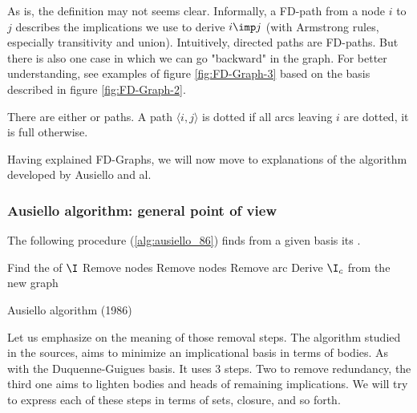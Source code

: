 \noindent As is, the definition may not seems clear. Informally, a FD-path 
from a node $i$ to $j$ describes the implications we use to derive $i \imp j$
(with Armstrong rules, especially transitivity and union). Intuitively, 
directed paths are FD-paths. But there is also one case in which
we can go "backward" in the graph. For better understanding, see examples of
figure \ref{fig:FD-Graph-3} based on the basis described in figure 
\ref{fig:FD-Graph-2}.

\begin{center}
	
\end{center}

There are either  or  paths. A path $\langle i, j
\rangle$ is dotted if all arcs leaving $i$ are dotted, it is full otherwise.

\begin{center}
	
\end{center}

\vspace{1.2em}

Having explained FD-Graphs, we will now move to explanations of the algorithm
developed by Ausiello and al.

\subsubsection{Ausiello algorithm: general point of view}

The following procedure (\ref{alg:ausiello_86}) finds from a given basis its
. 

\begin{algorithm}[H]

\BlankLine
\BlankLine

Find the  of $\I$ \;
Remove  nodes \;
Remove  nodes \;
Remove  arc \;
Derive $\I_c$ from the new graph \;

\caption{Ausiello algorithm (1986)}
\label{alg:ausiello_86}
\end{algorithm}

\vspace{1.2em}

Let us emphasize on the meaning of those removal steps.
The algorithm studied in the sources, aims to minimize an implicational basis 
in terms of bodies. As with the Duquenne-Guigues basis. It uses 3 steps. Two
to remove redundancy, the third one aims to lighten bodies and heads of 
remaining implications. We will try to express each of these steps in terms of
sets, closure, and so forth. 

